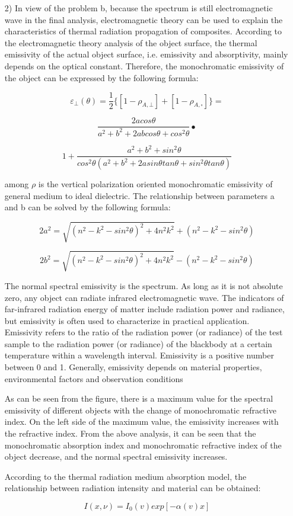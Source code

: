 \documentclass{apmcmthesis}
\begin{document}
\begin{itemize}
\item [2)]In view of the problem b, because the spectrum is still electromagnetic wave in the final analysis, electromagnetic theory can be used to explain the characteristics of thermal radiation propagation of composites. According to the electromagnetic theory analysis of the object surface, the thermal emissivity of the actual object surface, i.e. emissivity and absorptivity, mainly depends on the optical constant. Therefore, the monochromatic emissivity of the object can be expressed by the following formula:\par
\[\varepsilon_{\bot}(\theta)=\frac{1}{2}\{{[1-\rho_{A,\bot}]+[1-\rho_{A,\square}]}\}=\]\par
\[\frac{2acos\theta}{a^2+b^2+2abcos\theta+cos^2\theta}\bullet\]\par
\[1+\frac{a^2+b^2+sin^2\theta}{cos^2\theta(a^2+b^2+2asin\theta tan\theta+sin^2\theta tan\theta)}\]\par
among $\rho$ is the vertical polarization oriented monochromatic emissivity of general medium to ideal dielectric. The relationship between parameters a and b can be solved by the following formula:\par
\[2a^2=\sqrt{(n^2-k^2-sin^2\theta)^2+4n^2 k^2}+(n^2-k^2-sin^2\theta)\]\par
\[2b^2=\sqrt{(n^2-k^2-sin^2\theta)^2+4n^2 k^2}-(n^2-k^2-sin^2\theta)\]\par
\qquad The normal spectral emissivity is the spectrum. As long as it is not absolute zero, any object can radiate infrared electromagnetic wave. The indicators of far-infrared radiation energy of matter include radiation power and radiance, but emissivity is often used to characterize in practical application. \qquad Emissivity refers to the ratio of the radiation power (or radiance) of the test sample to the radiation power (or radiance) of the blackbody at a certain temperature within a wavelength interval. Emissivity is a positive number between 0 and 1. Generally, emissivity depends on material properties, environmental factors and observation conditions\par
\qquad As can be seen from the figure, there is a maximum value for the spectral emissivity of different objects with the change of monochromatic refractive index. On the left side of the maximum value, the emissivity increases with the refractive index. From the above analysis, it can be seen that the monochromatic absorption index and monochromatic refractive index of the object decrease, and the normal spectral emissivity increases.\par
\qquad According to the thermal radiation medium absorption model, the relationship between radiation intensity and material can be obtained:\par
\[I(x,\nu)=I_{0}(v)exp[-\alpha(v)x]\]\par


\end{itemize}
\end{document}
